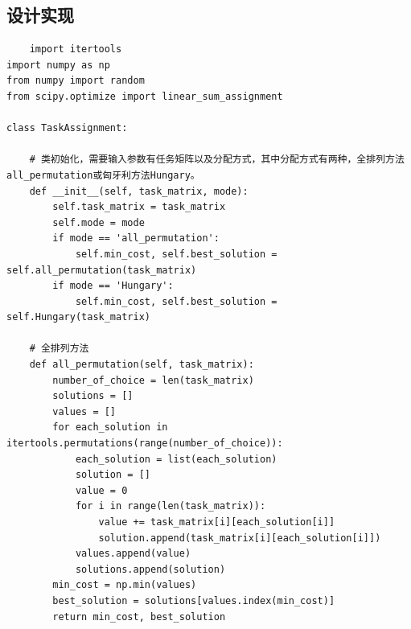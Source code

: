 \documentclass[UTF8,a4paper]{article}
\begin{document}
\subsection{设计实现}
\begin{lstlisting}
    import itertools
import numpy as np
from numpy import random
from scipy.optimize import linear_sum_assignment

class TaskAssignment:
 
    # 类初始化，需要输入参数有任务矩阵以及分配方式，其中分配方式有两种，全排列方法all_permutation或匈牙利方法Hungary。
    def __init__(self, task_matrix, mode):
        self.task_matrix = task_matrix
        self.mode = mode
        if mode == 'all_permutation':
            self.min_cost, self.best_solution = self.all_permutation(task_matrix)
        if mode == 'Hungary':
            self.min_cost, self.best_solution = self.Hungary(task_matrix)
 
    # 全排列方法
    def all_permutation(self, task_matrix):
        number_of_choice = len(task_matrix)
        solutions = []
        values = []
        for each_solution in itertools.permutations(range(number_of_choice)):
            each_solution = list(each_solution)
            solution = []
            value = 0
            for i in range(len(task_matrix)):
                value += task_matrix[i][each_solution[i]]
                solution.append(task_matrix[i][each_solution[i]])
            values.append(value)
            solutions.append(solution)
        min_cost = np.min(values)
        best_solution = solutions[values.index(min_cost)]
        return min_cost, best_solution
 

\end{lstlisting}
\end{document}
